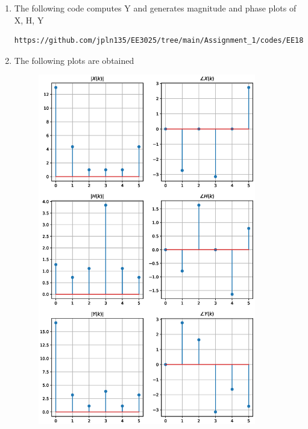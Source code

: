 \documentclass[journal,12pt,twocolumn]{IEEEtran}
\renewcommand\thesection{\arabic{section}}
\begin{document}
\begin{enumerate}[label=\thesection.\arabic*.,ref=\thesection.\theenumi]
\item The following code computes Y and generates magnitude and phase plots of X, H, Y
\begin{lstlisting}
https://github.com/jpln135/EE3025/tree/main/Assignment_1/codes/EE18BTECH11021.py
\end{lstlisting}

\item The following plots are obtained
\begin{figure}[!ht]
	\includegraphics[width=9.5cm]{./figs/EE18BTECH11021.eps}
\end{figure}
\end{enumerate}
\end{document}

